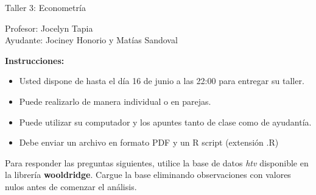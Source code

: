 \documentclass[letterpaper,11pt]{article}
\begin{document}
\begin{center}
    {\Large  Taller 3: Econometría }

Profesor:    Jocelyn Tapia\\
Ayudante: Jociney Honorio y Matías Sandoval 
\end{center}

\textbf{Instrucciones:} 

\begin{itemize}
    \item Usted dispone de hasta el día 16 de junio a las 22:00  para entregar su taller.
    \item Puede realizarlo de manera individual o en parejas.
       \item Puede utilizar su computador y los apuntes tanto de clase como de ayudantía.
    \item Debe enviar un archivo en formato PDF y un R script (extensión .R)
\end{itemize}



Para responder las preguntas siguientes, utilice la base de datos \textit{htv} 
disponible en la librería \textbf{wooldridge}. Cargue la base eliminando 
observaciones con valores nulos antes de comenzar el análisis.
\end{document}
